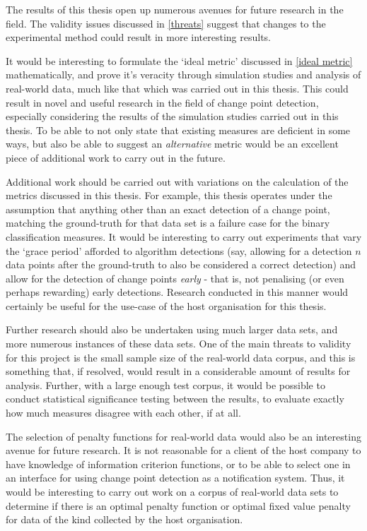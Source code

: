 \documentclass[../main.tex]{subfiles}
\begin{document}
The results of this thesis open up numerous avenues for future research in the field. The validity issues discussed in \autoref{threats} suggest that changes to the experimental method could result in more interesting results.

It would be interesting to formulate the `ideal metric' discussed in \autoref{ideal metric} mathematically, and prove it's veracity through simulation studies and analysis of real-world data, much like that which was carried out in this thesis. This could result in novel and useful research in the field of change point detection, especially considering the results of the simulation studies carried out in this thesis. To be able to not only state that existing measures are deficient in some ways, but also be able to suggest an \emph{alternative} metric would be an excellent piece of additional work to carry out in the future.

Additional work should be carried out with variations on the calculation of the metrics discussed in this thesis. For example, this thesis operates under the assumption that anything other than an exact detection of a change point, matching the ground-truth for that data set is a failure case for the binary classification measures. It would be interesting to carry out experiments that vary the `grace period' afforded to algorithm detections (say, allowing for a detection $n$ data points after the ground-truth to also be considered a correct detection) and allow for the detection of change points \emph{early} - that is, not penalising (or even perhaps rewarding) early detections. Research conducted in this manner would certainly be useful for the use-case of the host organisation for this thesis.

Further research should also be undertaken using much larger data sets, and more numerous instances of these data sets. One of the main threats to validity for this project is the small sample size of the real-world data corpus, and this is something that, if resolved, would result in a considerable amount of results for analysis. Further, with a large enough test corpus, it would be possible to conduct statistical significance testing between the results, to evaluate exactly how much measures disagree with each other, if at all.

The selection of penalty functions for real-world data would also be an interesting avenue for future research. It is not reasonable for a client of the host company to have knowledge of information criterion functions, or to be able to select one in an interface for using change point detection as a notification system. Thus, it would be interesting to carry out work on a corpus of real-world data sets to determine if there is an optimal penalty function or optimal fixed value penalty for data of the kind collected by the host organisation.
\end{document}
